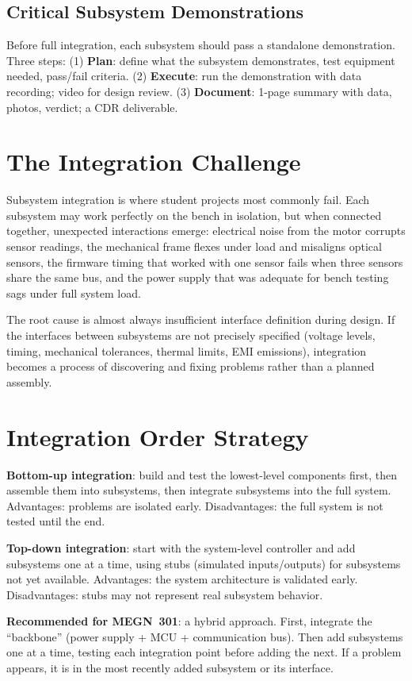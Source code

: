 \documentclass[11pt,letterpaper,twoside,openany]{book}
\begin{document}
\subsection{Critical Subsystem Demonstrations}
Before full integration, each subsystem should pass a standalone demonstration. Three steps: (1) \textbf{Plan}: define what the subsystem demonstrates, test equipment needed, pass/fail criteria. (2) \textbf{Execute}: run the demonstration with data recording; video for design review. (3) \textbf{Document}: 1-page summary with data, photos, verdict; a CDR deliverable.

\section{The Integration Challenge}
Subsystem integration is where student projects most commonly fail. Each subsystem may work perfectly on the bench in isolation, but when connected together, unexpected interactions emerge: electrical noise from the motor corrupts sensor readings, the mechanical frame flexes under load and misaligns optical sensors, the firmware timing that worked with one sensor fails when three sensors share the same bus, and the power supply that was adequate for bench testing sags under full system load.

The root cause is almost always insufficient interface definition during design. If the interfaces between subsystems are not precisely specified (voltage levels, timing, mechanical tolerances, thermal limits, EMI emissions), integration becomes a process of discovering and fixing problems rather than a planned assembly.

\section{Integration Order Strategy}
\textbf{Bottom-up integration}: build and test the lowest-level components first, then assemble them into subsystems, then integrate subsystems into the full system. Advantages: problems are isolated early. Disadvantages: the full system is not tested until the end.

\textbf{Top-down integration}: start with the system-level controller and add subsystems one at a time, using stubs (simulated inputs/outputs) for subsystems not yet available. Advantages: the system architecture is validated early. Disadvantages: stubs may not represent real subsystem behavior.

\textbf{Recommended for MEGN~301}: a hybrid approach. First, integrate the ``backbone'' (power supply + MCU + communication bus). Then add subsystems one at a time, testing each integration point before adding the next. If a problem appears, it is in the most recently added subsystem or its interface.
\end{document}
